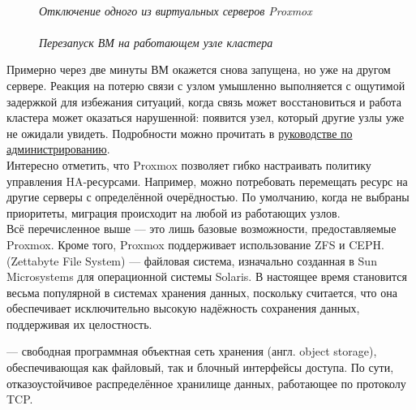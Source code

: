 \documentclass[14pt, a4paper]{article}
\begin{document}
\begin{figure}[h]
    \centering
    \\ 
    \small\textit{Отключение одного из виртуальных серверов Proxmox}\\
    \vspace{0.5cm}
    \\ 
    \small\textit{Перезапуск ВМ на работающем узле кластера}  
    \label{framework} 
\end{figure}

Примерно через две минуты ВМ окажется снова запущена, но уже на другом сервере. Реакция на
потерю связи с узлом умышленно выполняется с ощутимой задержкой для избежания ситуаций, когда
связь может восстановиться и работа кластера может оказаться нарушенной: появится узел, который
другие узлы уже не ожидали увидеть. Подробности можно прочитать в 
\href{https://pve.proxmox.com/pve-docs/pve-admin-guide.html#chapter_ha_manager}{руководстве по администрированию}.\\

Интересно отметить, что Proxmox позволяет гибко настраивать политику управления HA-ресурсами.
Например, можно потребовать перемещать ресурс на другие серверы с определённой очерёдностью.
По умолчанию, когда не выбраны приоритеты, миграция происходит на любой из работающих узлов.\\

Всё перечисленное выше — это лишь базовые возможности, предоставляемые Proxmox. Кроме того,
Proxmox поддерживает использование ZFS и CEPH.\\

\href{https://ru.wikipedia.org/wiki/ZFS}{} (Zettabyte File System) — файловая система, изначально созданная в Sun Microsystems для
операционной системы Solaris. В настоящее время становится весьма популярной в системах
хранения данных, поскольку считается, что она обеспечивает исключительно высокую надёжность
сохранения данных, поддерживая их целостность.

\href{https://ru.wikipedia.org/wiki/Ceph}{} — свободная программная объектная сеть хранения (англ. object storage), обеспечивающая как
файловый, так и блочный интерфейсы доступа. По сути, отказоустойчивое распределённое
хранилище данных, работающее по протоколу TCP.\\
\end{document}
